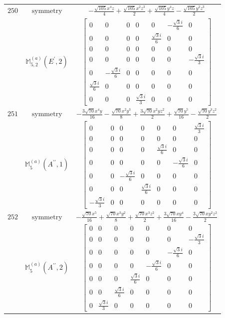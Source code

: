 \documentclass[fleqn,8pt,landscape]{jsarticle}
\begin{document}
\begin{longtable}{ccc}
$ 250 $ & $ \text{symmetry} $ & $ - \frac{\sqrt{105} x^{4} z}{4} + \frac{\sqrt{105} x^{2} z^{3}}{2} + \frac{\sqrt{105} y^{4} z}{4} - \frac{\sqrt{105} y^{2} z^{3}}{2} $ \\
$  $ & $ \mathbb{M}_{5,2}^{(a)}(E^{\prime},2) $ & $ \begin{bmatrix} 0 & 0 & 0 & 0 & 0 & - \frac{\sqrt{3} i}{6} & 0 \\ 0 & 0 & 0 & 0 & \frac{\sqrt{3} i}{6} & 0 & 0 \\ 0 & 0 & 0 & 0 & 0 & 0 & 0 \\ 0 & 0 & 0 & 0 & 0 & 0 & - \frac{\sqrt{3} i}{3} \\ 0 & - \frac{\sqrt{3} i}{6} & 0 & 0 & 0 & 0 & 0 \\ \frac{\sqrt{3} i}{6} & 0 & 0 & 0 & 0 & 0 & 0 \\ 0 & 0 & 0 & \frac{\sqrt{3} i}{3} & 0 & 0 & 0 \end{bmatrix} $ \\ \hline
$ 251 $ & $ \text{symmetry} $ & $ - \frac{3 \sqrt{70} x^{4} y}{16} - \frac{\sqrt{70} x^{2} y^{3}}{8} + \frac{3 \sqrt{70} x^{2} y z^{2}}{2} + \frac{\sqrt{70} y^{5}}{16} - \frac{\sqrt{70} y^{3} z^{2}}{2} $ \\
$  $ & $ \mathbb{M}_{5}^{(a)}(A^{\prime\prime},1) $ & $ \begin{bmatrix} 0 & 0 & 0 & 0 & 0 & 0 & \frac{\sqrt{3} i}{3} \\ 0 & 0 & 0 & 0 & 0 & 0 & 0 \\ 0 & 0 & 0 & 0 & \frac{\sqrt{3} i}{6} & 0 & 0 \\ 0 & 0 & 0 & 0 & 0 & - \frac{\sqrt{3} i}{6} & 0 \\ 0 & 0 & - \frac{\sqrt{3} i}{6} & 0 & 0 & 0 & 0 \\ 0 & 0 & 0 & \frac{\sqrt{3} i}{6} & 0 & 0 & 0 \\ - \frac{\sqrt{3} i}{3} & 0 & 0 & 0 & 0 & 0 & 0 \end{bmatrix} $ \\ \hline
$ 252 $ & $ \text{symmetry} $ & $ - \frac{\sqrt{70} x^{5}}{16} + \frac{\sqrt{70} x^{3} y^{2}}{8} + \frac{\sqrt{70} x^{3} z^{2}}{2} + \frac{3 \sqrt{70} x y^{4}}{16} - \frac{3 \sqrt{70} x y^{2} z^{2}}{2} $ \\
$  $ & $ \mathbb{M}_{5}^{(a)}(A^{\prime\prime},2) $ & $ \begin{bmatrix} 0 & 0 & 0 & 0 & 0 & 0 & 0 \\ 0 & 0 & 0 & 0 & 0 & 0 & - \frac{\sqrt{3} i}{3} \\ 0 & 0 & 0 & 0 & 0 & - \frac{\sqrt{3} i}{6} & 0 \\ 0 & 0 & 0 & 0 & - \frac{\sqrt{3} i}{6} & 0 & 0 \\ 0 & 0 & 0 & \frac{\sqrt{3} i}{6} & 0 & 0 & 0 \\ 0 & 0 & \frac{\sqrt{3} i}{6} & 0 & 0 & 0 & 0 \\ 0 & \frac{\sqrt{3} i}{3} & 0 & 0 & 0 & 0 & 0 \end{bmatrix} $ \\ \hline

\end{longtable}
\end{document}
